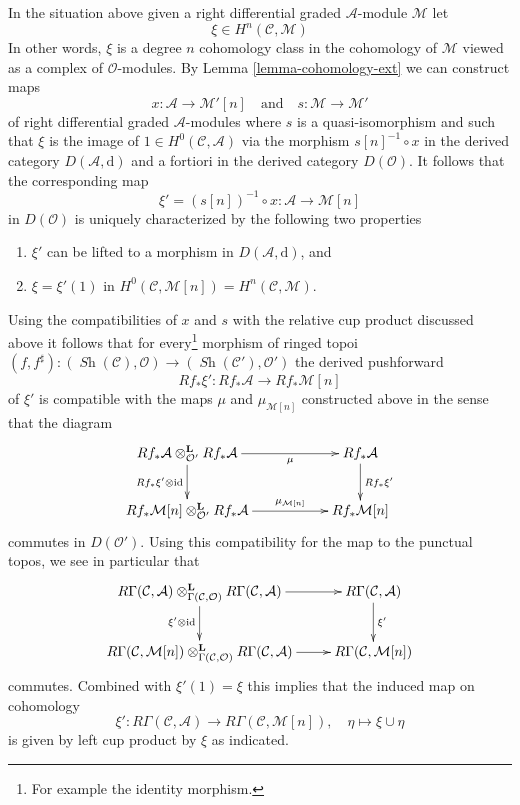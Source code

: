 \documentclass{stacks-project}
\theoremstyle{plain}
\theoremstyle{definition}
\theoremstyle{remark}
\numberwithin{equation}{subsection}
\def\Sh{\mathop{\mathit{Sh}}\nolimits}
\begin{document}
\medskip\noindent
In the situation above given a right differential graded $\mathcal{A}$-module
$\mathcal{M}$ let
$$
\xi \in H^n(\mathcal{C}, \mathcal{M})
$$
In other words, $\xi$ is a degree $n$ cohomology class in the cohomology
of $\mathcal{M}$ viewed as a complex of $\mathcal{O}$-modules. By
Lemma \ref{lemma-cohomology-ext} we can construct maps
$$
x : \mathcal{A} \rightarrow \mathcal{M}'[n]
\quad\text{and}\quad
s : \mathcal{M} \to \mathcal{M}'
$$
of right differential graded $\mathcal{A}$-modules where $s$ is a
quasi-isomorphism and such that $\xi$ is the image of
$1 \in H^0(\mathcal{C}, \mathcal{A})$ via the morphism
$s[n]^{-1} \circ x$ in the derived category
$D(\mathcal{A}, \text{d})$ and a fortiori in the derived
category $D(\mathcal{O})$. It follows that the corresponding map
$$
\xi' = (s[n])^{-1} \circ x : \mathcal{A} \longrightarrow \mathcal{M}[n]
$$
in $D(\mathcal{O})$ is uniquely characterized by the following
two properties
\begin{enumerate}
\item $\xi'$ can be lifted to a morphism in $D(\mathcal{A}, \text{d})$, and
\item $\xi = \xi'(1)$ in
$H^0(\mathcal{C}, \mathcal{M}[n]) = H^n(\mathcal{C}, \mathcal{M})$.
\end{enumerate}
Using the compatibilities of $x$ and $s$ with the relative cup product
discussed above it follows that for every\footnote{For example
the identity morphism.} morphism of ringed topoi
$(f, f^\sharp) : (\Sh(\mathcal{C}), \mathcal{O})
\to (\Sh(\mathcal{C}'), \mathcal{O}')$ the derived pushforward
$$
Rf_*\xi' : Rf_*\mathcal{A}  \longrightarrow Rf_*\mathcal{M}[n]
$$
of $\xi'$ is compatible with the maps $\mu$ and $\mu_{\mathcal{M}[n]}$
constructed above in the sense that the diagram
$$
\xymatrix{
Rf_*\mathcal{A} \otimes_{\mathcal{O}'}^\mathbf{L} Rf_*\mathcal{A}
\ar[rr]_-\mu \ar[d]_{Rf_*\xi' \otimes \text{id}}  & &
Rf_*\mathcal{A} \ar[d]^{Rf_*\xi'} \\
Rf_*\mathcal{M}[n] \otimes_{\mathcal{O}'}^\mathbf{L} Rf_*\mathcal{A}
\ar[rr]^-{\mu_{\mathcal{M}[n]}} & &
Rf_*\mathcal{M}[n]
}
$$
commutes in $D(\mathcal{O}')$. Using this compatibility for the
map to the punctual topos, we see in particular that
$$
\xymatrix{
R\Gamma(\mathcal{C}, \mathcal{A})
\otimes_{\Gamma(\mathcal{C}, \mathcal{O})}^\mathbf{L}
R\Gamma(\mathcal{C}, \mathcal{A})
\ar[d]_{\xi' \otimes \text{id}} \ar[r] &
R\Gamma(\mathcal{C}, \mathcal{A}) \ar[d]^{\xi'} \\
R\Gamma(\mathcal{C}, \mathcal{M}[n])
\otimes_{\Gamma(\mathcal{C}, \mathcal{O})}^\mathbf{L}
R\Gamma(\mathcal{C}, \mathcal{A})
\ar[r] &
R\Gamma(\mathcal{C}, \mathcal{M}[n])
}
$$
commutes. Combined with $\xi'(1) = \xi$ this implies that
the induced map on cohomology
$$
\xi' : R\Gamma(\mathcal{C}, \mathcal{A}) \to
R\Gamma(\mathcal{C}, \mathcal{M}[n]), \quad \eta \mapsto \xi \cup \eta
$$
is given by left cup product by $\xi$ as indicated.
\end{document}
